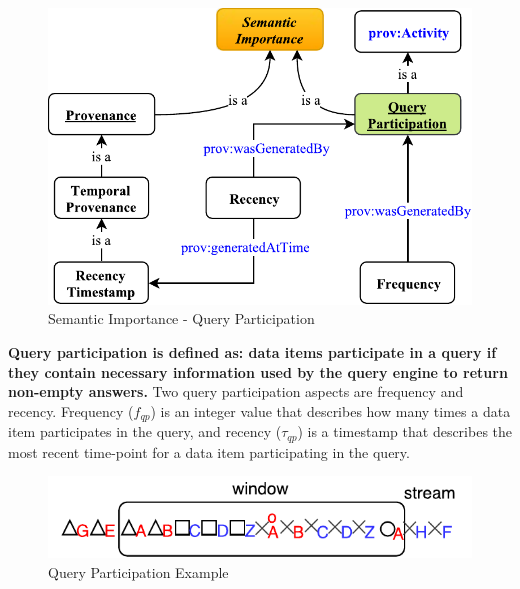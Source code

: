 \begin{figure}[!htbp]
	\centering
    \includegraphics[width=5in]{img/3-siqp.pdf}
    \caption{Semantic Importance - Query Participation}
    \label{fig:3-siqp}
\end{figure}

\textbf{Query participation is defined as: data items participate in a query if they contain necessary information used by the query engine to return non-empty answers.}
Two query participation aspects are frequency and recency.
Frequency ($f_{qp}$) is an integer value that describes how many times a data item participates in the query, 
and recency ($\tau_{qp}$) is a timestamp that describes the most recent time-point for a data item participating in the query.

\begin{figure}[!htbp]
	\centering
    \includegraphics[width=5in]{img/3-siqpe.pdf}
    \caption{Query Participation Example}
    \label{fig:3-siqpe}
\end{figure}

